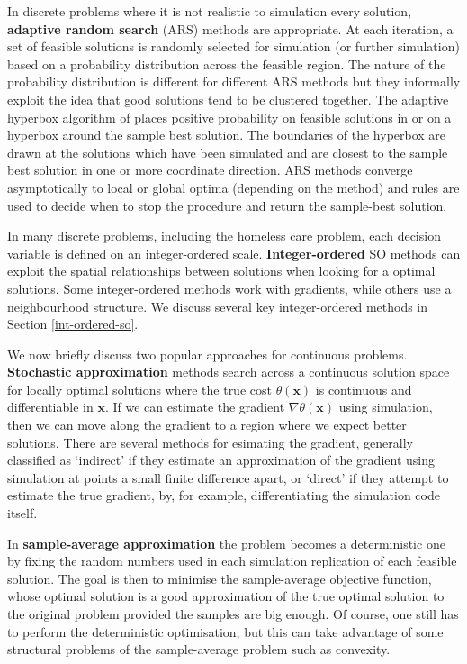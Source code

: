 \documentclass[12pt,a4paper]{article}
\begin{document}
In discrete problems where it is not realistic to simulation every solution, \textbf{adaptive random search} (ARS) methods are appropriate. At each iteration, a set of feasible solutions is randomly selected for simulation (or further simulation) based on a probability distribution across the feasible region. The nature of the probability distribution is different for different ARS methods but they informally exploit the idea that good solutions tend to be clustered together. The adaptive hyperbox algorithm of \cite{xu2013adaptive} places positive probability on feasible solutions in or on a hyperbox around the sample best solution. The boundaries of the hyperbox are drawn at the solutions which have been simulated and are closest to the sample best solution in one or more coordinate direction. ARS methods converge asymptotically to local or global optima (depending on the method) and rules are used to decide when to stop the procedure and return the sample-best solution.

In many discrete problems, including the homeless care problem, each decision variable is defined on an integer-ordered scale. \textbf{Integer-ordered} SO methods can exploit the spatial relationships between solutions when looking for a optimal solutions. Some integer-ordered methods work with gradients, while others use a neighbourhood structure. We discuss several key integer-ordered methods in Section \ref{int-ordered-so}. 

We now briefly discuss two popular approaches for continuous problems. \textbf{Stochastic approximation} methods search across a continuous solution space for locally optimal solutions where the true cost $\theta(\boldsymbol{x})$ is continuous and differentiable in $\boldsymbol{x}$. If we can estimate the gradient $\nabla \theta(\boldsymbol{x})$ using simulation, then we can move along the gradient to a region where we expect better solutions. There are several methods for esimating the gradient, generally classified as `indirect' if they estimate an approximation of the gradient using simulation at points a small finite difference apart, or `direct' if they attempt to estimate the true gradient, by, for example, differentiating the simulation code itself. 

In \textbf{sample-average approximation} the problem becomes a deterministic one by fixing the random numbers used in each simulation replication of each feasible solution. The goal is then to minimise the sample-average objective function, whose optimal solution is a good approximation of the true optimal solution to the original problem provided the samples are big enough. Of course, one still has to perform the deterministic optimisation, but this can take advantage of some structural problems of the sample-average problem such as convexity. 
\end{document}
